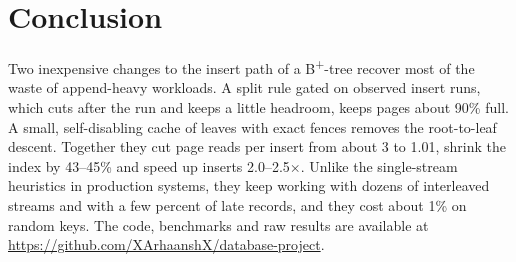 \documentclass[conference]{IEEEtran}
\newcommand{\bp}{B\textsuperscript{+}-tree}
\begin{document}
\section{Conclusion}
Two inexpensive changes to the insert path of a \bp{} recover most of the
waste of append-heavy workloads. A split rule gated on observed insert runs,
which cuts after the run and keeps a little headroom, keeps pages about 90\%
full. A small, self-disabling cache of leaves with exact fences removes the
root-to-leaf descent. Together they cut page reads per insert from about 3 to
1.01, shrink the index by 43--45\% and speed up inserts 2.0--2.5$\times$.
Unlike the single-stream heuristics in production systems, they keep working
with dozens of interleaved streams and with a few percent of late records, and
they cost about 1\% on random keys. The code, benchmarks and raw results are
available at \url{https://github.com/XArhaanshX/database-project}.



\end{document}
